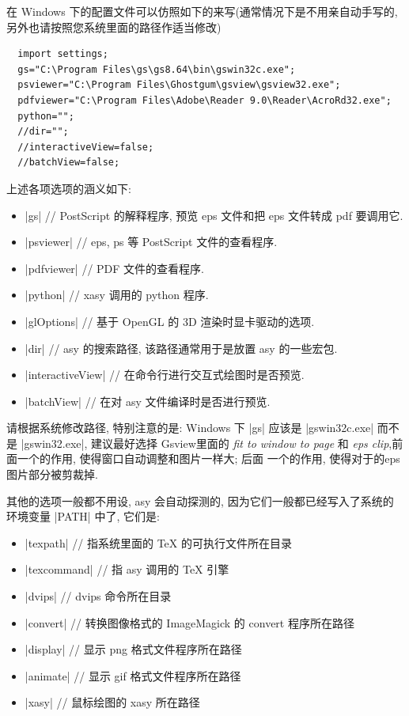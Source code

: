 \documentclass{ctexbook}
\begin{document}
在 Windows 下的配置文件可以仿照如下的来写(通常情况下是不用亲自动手写的,
另外也请按照您系统里面的路径作适当修改)

\begin{lstlisting}
  import settings;
  gs="C:\Program Files\gs\gs8.64\bin\gswin32c.exe";
  psviewer="C:\Program Files\Ghostgum\gsview\gsview32.exe";
  pdfviewer="C:\Program Files\Adobe\Reader 9.0\Reader\AcroRd32.exe";
  python="";
  //dir="";
  //interactiveView=false;
  //batchView=false;
\end{lstlisting}

上述各项选项的涵义如下:
\begin{itemize}
\item |gs| // PostScript 的解释程序, 预览 eps 文件和把 eps 文件转成 pdf
  要调用它.
\item |psviewer| //  eps, ps 等 PostScript 文件的查看程序.
\item |pdfviewer| // PDF 文件的查看程序.
\item |python| // xasy 调用的 python 程序.
\item |glOptions| // 基于 OpenGL 的 3D 渲染时显卡驱动的选项.
\item |dir|    // asy 的搜索路径, 该路径通常用于是放置 asy 的一些宏包.
\item |interactiveView| // 在命令行进行交互式绘图时是否预览.
\item |batchView| // 在对 asy 文件编译时是否进行预览.
\end{itemize}
请根据系统修改路径, 特别注意的是: Windows 下 |gs| 应该是 |gswin32c.exe| 而不是
|gswin32.exe|, 建议最好选择 Gsview里面的 \emph{fit to window to page}
和 \emph{eps clip},前面一个的作用, 使得窗口自动调整和图片一样大; 后面
一个的作用, 使得对于的eps图片部分被剪裁掉.

其他的选项一般都不用设, asy 会自动探测的, 因为它们一般都已经写入了系统的
环境变量 |PATH| 中了, 它们是:
\begin{itemize}
\item |texpath| // 指系统里面的 TeX 的可执行文件所在目录
\item |texcommand| // 指 asy 调用的 TeX 引擎
\item |dvips|  // dvips 命令所在目录
\item |convert| // 转换图像格式的 ImageMagick 的 convert 程序所在路径
\item |display| // 显示 png 格式文件程序所在路径
\item |animate| // 显示 gif 格式文件程序所在路径
\item |xasy| // 鼠标绘图的 xasy 所在路径
\end{itemize}
\end{document}
